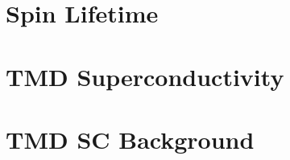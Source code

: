 \documentclass[oneside,12pt]{memoir}
\begin{document}
  \frontmatter{}
  
  
  
  \pagestyle{thesis}
  
  
  
  \newpage
  \tableofcontents
  \newpage
  \listoffigures
  \mainmatter{}
  

  \chapter{Spin Lifetime}
  
  
  
  
  
  

  \chapter{TMD Superconductivity}
  
  
  
  
  
  

  \chapter{TMD SC Background}
  
  
  
  
  
  
  
  
  \backmatter{}
  \SingleSpacing{}
\end{document}
